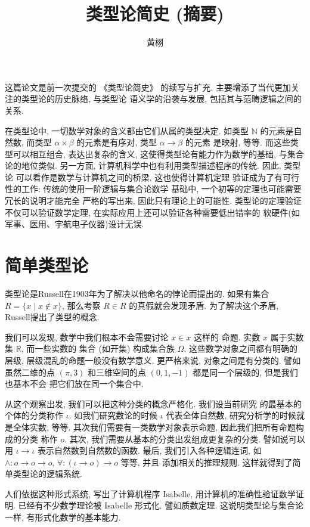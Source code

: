 \documentclass[UTF8, zihao=-4]{ctexart}
\title{类型论简史 (摘要)}
\date{}
\author{黄栩}
\theoremstyle{plain}
\theoremstyle{definition}
\theoremstyle{remark}
\begin{document}
\maketitle

这篇论文是前一次提交的 《类型论简史》 的续写与扩充.
主要增添了当代更加关注的类型论的历史脉络, 与类型论
语义学的沿袭与发展, 包括其与范畴逻辑之间的关系.

在类型论中, 一切数学对象的含义都由它们从属的类型决定.
如类型 \(\mathbb N\) 的元素是自然数, 而类型 \(\alpha \times \beta\)
的元素是有序对, 类型 \(\alpha \to\beta\) 的元素
是映射, 等等. 而这些类型可以相互组合, 表达出复杂的含义,
这使得类型论有能力作为数学的基础, 与集合论的地位类似.
另一方面, 计算机科学中也有利用类型描述程序的传统. 因此, 类型论
可以看作是数学与计算机之间的桥梁. 这也使得计算机定理
验证成为了有可行性的工作: 传统的使用一阶逻辑与集合论数学
基础中, 一个初等的定理也可能需要冗长的说明才能完全
严格的写出来, 因此只有理论上的可能性.
类型论的定理验证不仅可以验证数学定理,
在实际应用上还可以验证各种需要低出错率的
软硬件(如军事、医用、宇航电子仪器)设计无误.

\section*{简单类型论}
类型论是Russell在1903年为了解决以他命名的悖论而提出的.
如果有集合 \(R = \{x \mid x \notin x\}\), 那么考察
\(R \in R\) 的真假就会发现矛盾. 为了解决这个矛盾,
Russell提出了类型的概念.

我们可以发现, 数学中我们根本不会需要讨论 \(x \in x\) 这样的
命题. 实数 \(x\) 属于实数集 \(\mathbb R\), 而一些实数的
集合 (如开集) 构成集合族 \(\Omega\). 这些数学对象之间都有明确的层级,
层级混乱的命题一般没有数学意义.
更严格来说, 对象之间是有分类的. 譬如虽然二维的点 \((\pi, 3)\)
和三维空间的点 \((0,1,-1)\) 都是同一个层级的, 但是我们也基本不会
把它们放在同一个集合中.

从这个观察出发, 我们可以把这种分类的概念严格化. 我们设当前研究
的最基本的个体的分类称作 \(\iota\). 如我们研究数论的时候
\(\iota\) 代表全体自然数, 研究分析学的时候就是全体实数, 等等.
其次我们需要有一类数学对象表示命题, 因此我们把所有命题构成的分类
称作 \(o\).
其次, 我们需要从基本的分类出发组成更复杂的分类. 譬如说可以用
\(\iota \to \iota\) 表示自然数到自然数的函数.
最后, 我们引入各种逻辑连词, 如 \(\wedge : o \to o \to o\),
\(\forall : (\iota \to o) \to o\)  等等, 并且
添加相关的推理规则. 这样就得到了简单类型论的逻辑系统.

人们依据这种形式系统, 写出了计算机程序 Isabelle,
用计算机的准确性验证数学证明. 已经有不少数学理论被 Isabelle 形式化.
譬如质数定理. 这说明类型论与集合论一样, 有形式化数学的基本能力.
\end{document}
